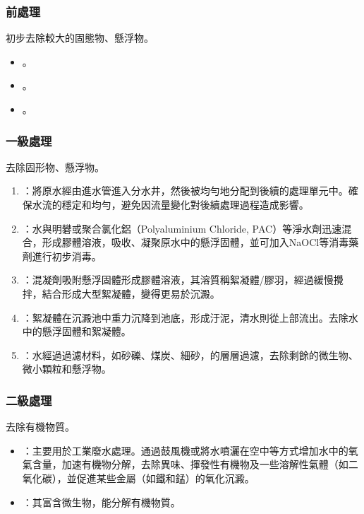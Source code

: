 \documentclass[a4paper,12pt]{report}
\begin{document}
\begin{itemize}
\begin{itemize}
\subsubsection{前處理}
初步去除較大的固態物、懸浮物。
\begin{itemize}
\item {}。
\item {}。
\item {}。
\end{itemize}
\subsubsection{一級處理}
去除固形物、懸浮物。
\begin{enumerate}
\item {}：將原水經由進水管進入分水井，然後被均勻地分配到後續的處理單元中。確保水流的穩定和均勻，避免因流量變化對後續處理過程造成影響。
\item {}：水與明礬或聚合氯化鋁（Polyaluminium Chloride, PAC）等淨水劑迅速混合，形成膠體溶液，吸收、凝聚原水中的懸浮固體，並可加入NaOCl等消毒藥劑進行初步消毒。
\item {}：混凝劑吸附懸浮固體形成膠體溶液，其溶質稱絮凝體/膠羽，經過緩慢攪拌，結合形成大型絮凝體，變得更易於沉澱。
\item {}：絮凝體在沉澱池中重力沉降到池底，形成汙泥，清水則從上部流出。去除水中的懸浮固體和絮凝體。
\item {}：水經過過濾材料，如砂礫、煤炭、細砂，的層層過濾，去除剩餘的微生物、微小顆粒和懸浮物。
\end{enumerate}
\subsubsection{二級處理}
去除有機物質。
\begin{itemize}
\item {}：主要用於工業廢水處理。通過鼓風機或將水噴灑在空中等方式增加水中的氧氣含量，加速有機物分解，去除異味、揮發性有機物及一些溶解性氣體（如二氧化碳），並促進某些金屬（如鐵和錳）的氧化沉澱。
\item {}：其富含微生物，能分解有機物質。
\end{itemize}

\end{itemize}
\end{itemize}
\end{document}
